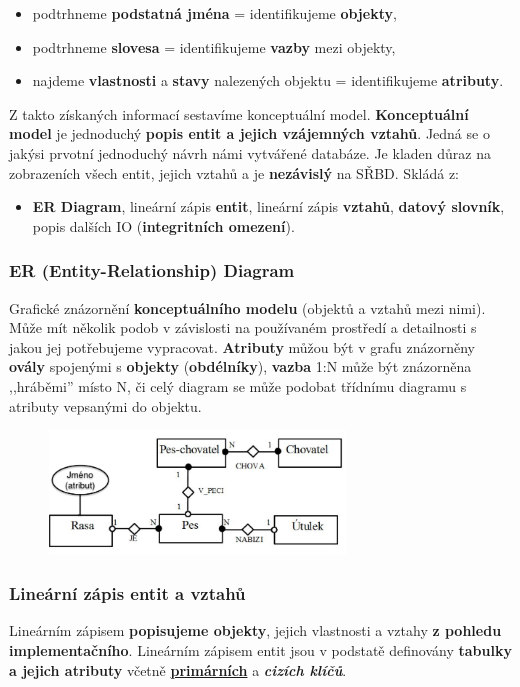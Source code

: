 \begin{itemize}
\item podtrhneme \textbf{podstatná jména} = identifikujeme \textbf{objekty},
\item podtrhneme \textbf{slovesa} = identifikujeme \textbf{vazby} mezi objekty,
\item najdeme \textbf{vlastnosti} a \textbf{stavy} nalezených objektu = identifikujeme \textbf{atributy}.
\end{itemize}

Z takto získaných informací sestavíme konceptuální model. \textbf{Konceptuální model} je jednoduchý \textbf{popis entit a jejich vzájemných vztahů}. Jedná se o jakýsi prvotní jednoduchý návrh námi vytvářené databáze. Je kladen důraz na zobrazeních všech entit, jejich vztahů a je \textbf{nezávislý} na SŘBD. Skládá z:
\begin{itemize}
\item \textbf{ER Diagram}, lineární zápis \textbf{entit}, lineární zápis \textbf{vztahů}, \textbf{datový slovník}, popis dalších IO (\textbf{integritních omezení}).
\end{itemize}

\subsubsection{ER (Entity-Relationship) Diagram}
Grafické znázornění \textbf{konceptuálního modelu} (objektů a vztahů mezi nimi). Může mít několik podob v závislosti na používaném prostředí a detailnosti s jakou jej potřebujeme vypracovat. \textbf{Atributy} můžou být v grafu znázorněny \textbf{ovály} spojenými s \textbf{objekty} (\textbf{obdélníky}), \textbf{vazba} 1:N může být znázorněna ,,hráběmi'' místo N, či celý diagram se může podobat třídnímu diagramu s atributy vepsanými do objektu.

\begin{figure}[H]
	\centering
	\includegraphics[width=0.7\textwidth]{assets/erdiagram.png}
\end{figure}

\subsubsection{Lineární zápis entit a vztahů}
Lineárním zápisem \textbf{popisujeme objekty}, jejich vlastnosti a vztahy \textbf{z pohledu implementačního}. Lineárním zápisem entit jsou v podstatě definovány \textbf{tabulky a jejich atributy} včetně \underline{\textbf{primárních}} a \textbf{\textit{cizích klíčů}}. 

